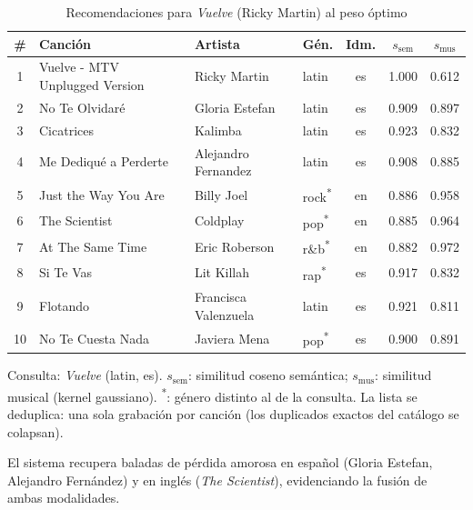 \begin{table}[htbp]
  \centering
  \begin{threeparttable}
  \caption{Recomendaciones para \emph{Vuelve} (Ricky Martin) al peso óptimo}
  \label{tab:qual_case_vuelve}
  \small
  \begin{tabular}{clllccc}
    \toprule
    \# & Canción & Artista & Gén. & Idm. & $s_{\text{sem}}$ & $s_{\text{mus}}$ \\
    \midrule
    1 & Vuelve - MTV Unplugged Version & Ricky Martin & latin & es & 1.000 & 0.612 \\
    2 & No Te Olvidaré & Gloria Estefan & latin & es & 0.909 & 0.897 \\
    3 & Cicatrices & Kalimba & latin & es & 0.923 & 0.832 \\
    4 & Me Dediqué a Perderte & Alejandro Fernandez & latin & es & 0.908 & 0.885 \\
    5 & Just the Way You Are & Billy Joel & rock\textsuperscript{*} & en & 0.886 & 0.958 \\
    6 & The Scientist & Coldplay & pop\textsuperscript{*} & en & 0.885 & 0.964 \\
    7 & At The Same Time & Eric Roberson & r\&b\textsuperscript{*} & en & 0.882 & 0.972 \\
    8 & Si Te Vas & Lit Killah & rap\textsuperscript{*} & es & 0.917 & 0.832 \\
    9 & Flotando & Francisca Valenzuela & latin & es & 0.921 & 0.811 \\
    10 & No Te Cuesta Nada & Javiera Mena & pop\textsuperscript{*} & es & 0.900 & 0.891 \\
    \bottomrule
  \end{tabular}
  \begin{tablenotes}[flushleft]
    \small
    \item Consulta: \emph{Vuelve} (latin, es). $s_{\text{sem}}$: similitud coseno semántica; $s_{\text{mus}}$: similitud musical (kernel gaussiano). \textsuperscript{*}: género distinto al de la consulta. La lista se deduplica: una sola grabación por canción (los duplicados exactos del catálogo se colapsan).
    \item El sistema recupera baladas de pérdida amorosa en español (Gloria Estefan, Alejandro Fernández) y en inglés (\emph{The Scientist}), evidenciando la fusión de ambas modalidades.
  \end{tablenotes}
  \end{threeparttable}
\end{table}